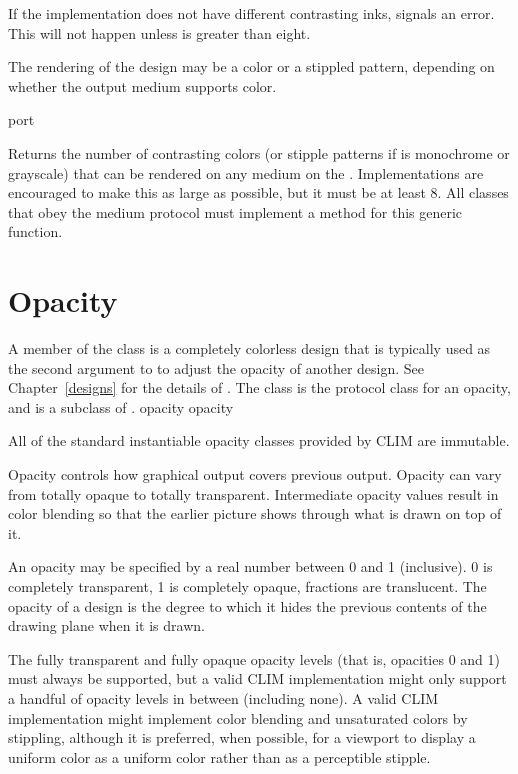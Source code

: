 If the implementation does not have  different contrasting inks,
 signals an error.  This will not happen unless
 is greater than eight.

The rendering of the design may be a color or a stippled pattern, depending on
whether the output medium supports color.

 {port}

Returns the number of contrasting colors (or stipple patterns if  is
monochrome or grayscale) that can be rendered on any medium on the 
.  Implementations are encouraged to make this as large as possible,
but it must be at least 8.  All classes that obey the medium protocol must
implement a method for this generic function.


\section {Opacity}


A member of the class  is a completely colorless design that is
typically used as the second argument to  to adjust the opacity
of another design.  See Chapter~\ref{designs} for the details of
.  The  class is the protocol class for an opacity,
and is a subclass of .
 {opacity} {opacity}

All of the standard instantiable opacity classes provided by CLIM are immutable.

Opacity controls how graphical output covers previous output.  Opacity can vary
from totally opaque to totally transparent.  Intermediate opacity values result
in color blending so that the earlier picture shows through what is drawn on top
of it.

An opacity may be specified by a real number between 0 and 1 (inclusive).  0 is
completely transparent, 1 is completely opaque, fractions are translucent.  The
opacity of a design is the degree to which it hides the previous contents of the
drawing plane when it is drawn.

The fully transparent and fully opaque opacity levels (that is, opacities 0 and
1) must always be supported, but a valid CLIM implementation might only support
a handful of opacity levels in between (including none).  A valid CLIM
implementation might implement color blending and unsaturated colors by
stippling, although it is preferred, when possible, for a viewport to display a
uniform color as a uniform color rather than as a perceptible stipple.

